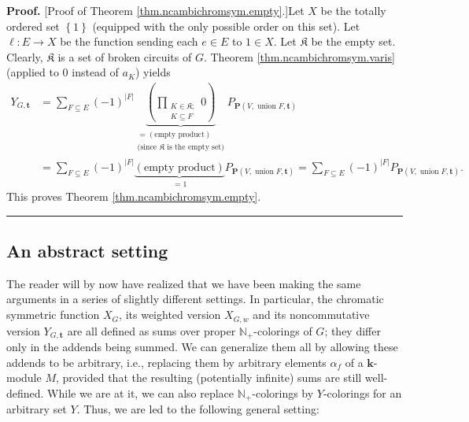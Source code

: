 \documentclass[numbers=enddot,12pt,final,onecolumn,notitlepage]{scrartcl}%
\theoremstyle{definition}
\newenvironment{proof}[1][Proof]{\noindent\textbf{#1.} }{\ \rule{0.5em}{0.5em}}
\newenvironment{verlong}{}{}
\let\sumnonlimits\sum
\let\prodnonlimits\prod
\renewcommand{\sum}{\sumnonlimits\limits}
\renewcommand{\prod}{\prodnonlimits\limits}
\begin{document}
\begin{verlong}
\begin{proof}
[Proof of Theorem \ref{thm.ncambichromsym.empty}.]Let $X$ be the totally
ordered set $\left\{  1\right\}  $ (equipped with the only possible order on
this set). Let $\ell:E\rightarrow X$ be the function sending each $e\in E$ to
$1\in X$. Let $\mathfrak{K}$ be the empty set. Clearly, $\mathfrak{K}$ is a
set of broken circuits of $G$. Theorem \ref{thm.ncambichromsym.varis} (applied
to $0$ instead of $a_{K}$) yields%
\begin{align*}
Y_{G,\mathbf{t}}  &  =\sum_{F\subseteq E}\left(  -1\right)  ^{\left\vert
F\right\vert }\underbrace{\left(  \prod_{\substack{K\in\mathfrak{K}%
;\\K\subseteq F}}0\right)  }_{\substack{=\left(  \text{empty product}\right)
\\\text{(since }\mathfrak{K}\text{ is the empty set)}}}P_{\mathbf{P}\left(
V,\operatorname*{union}F,\mathbf{t}\right)  }\\
&  =\sum_{F\subseteq E}\left(  -1\right)  ^{\left\vert F\right\vert
}\underbrace{\left(  \text{empty product}\right)  }_{=1}P_{\mathbf{P}\left(
V,\operatorname*{union}F,\mathbf{t}\right)  }=\sum_{F\subseteq E}\left(
-1\right)  ^{\left\vert F\right\vert }P_{\mathbf{P}\left(
V,\operatorname*{union}F,\mathbf{t}\right)  }.
\end{align*}
This proves Theorem \ref{thm.ncambichromsym.empty}.
\end{proof}
\end{verlong}

\subsection{An abstract setting}

The reader will by now have realized that we have been making the same
arguments in a series of slightly different settings. In particular, the
chromatic symmetric function $X_{G}$, its weighted version $X_{G,w}$ and its
noncommutative version $Y_{G,\mathbf{t}}$ are all defined as sums over proper
$\mathbb{N}_{+}$-colorings of $G$; they differ only in the addends being
summed. We can generalize them all by allowing these addends to be arbitrary,
i.e., replacing them by arbitrary elements $\alpha_{f}$ of a $\mathbf{k}%
$-module $M$, provided that the resulting (potentially infinite) sums are
still well-defined. While we are at it, we can also replace $\mathbb{N}_{+}%
$-colorings by $Y$-colorings for an arbitrary set $Y$. Thus, we are led to the
following general setting:
\end{document}
